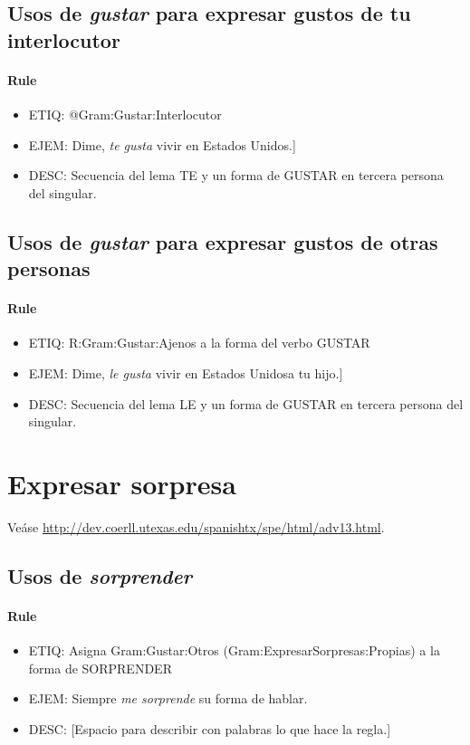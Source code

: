 \documentclass[11pt]{report}
\begin{document}
\subsection{Usos de \emph{gustar} para expresar gustos de tu interlocutor}
\paragraph*{Rule}
\begin{itemize}
\item ETIQ: @Gram:Gustar:Interlocutor
\item EJEM: Dime, \emph{te gusta} vivir en Estados Unidos.] 
\item DESC: Secuencia del lema TE y un forma de GUSTAR en tercera persona del singular.
\end{itemize}

\subsection{Usos de \emph{gustar} para expresar gustos de otras personas}
\paragraph*{Rule}
\begin{itemize}
\item ETIQ: R:Gram:Gustar:Ajenos a la forma del verbo GUSTAR
\item EJEM: Dime, \emph{le gusta} vivir en Estados Unidosa tu hijo.] 
\item DESC: Secuencia del lema LE y un forma de GUSTAR en tercera persona del singular.
\end{itemize}

\section{Expresar sorpresa}
Veáse \url{http://dev.coerll.utexas.edu/spanishtx/spe/html/adv13.html}.

\subsection{Usos de \emph{sorprender}}
\paragraph*{Rule}
\begin{itemize}
\item ETIQ: Asigna Gram:Gustar:Otros (Gram:ExpresarSorpresas:Propias) a la forma de SORPRENDER
\item EJEM: Siempre \emph{me sorprende} su forma de hablar.
\item DESC: [Espacio para describir con palabras lo que hace la regla.]
\end{itemize}
\end{document}
